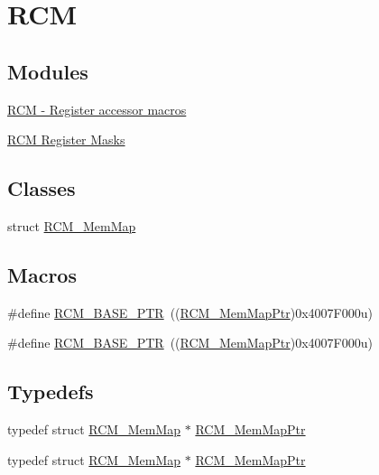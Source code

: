 \hypertarget{group___r_c_m___peripheral}{}\section{R\+CM}
\label{group___r_c_m___peripheral}
\subsection*{Modules}
\begin{DoxyCompactItemize}
\item 
\hyperlink{group___r_c_m___register___accessor___macros}{R\+C\+M -\/ Register accessor macros}
\item 
\hyperlink{group___r_c_m___register___masks}{R\+C\+M Register Masks}
\end{DoxyCompactItemize}
\subsection*{Classes}
\begin{DoxyCompactItemize}
\item 
struct \hyperlink{struct_r_c_m___mem_map}{R\+C\+M\+\_\+\+Mem\+Map}
\end{DoxyCompactItemize}
\subsection*{Macros}
\begin{DoxyCompactItemize}
\item 
\#define \hyperlink{group___r_c_m___peripheral_ga25ab3aa8d593d455ed36a52c77f88234}{R\+C\+M\+\_\+\+B\+A\+S\+E\+\_\+\+P\+TR}~((\hyperlink{group___r_c_m___peripheral_ga787b1c58d947f0b81c2502227dd0396b}{R\+C\+M\+\_\+\+Mem\+Map\+Ptr})0x4007\+F000u)
\item 
\#define \hyperlink{group___r_c_m___peripheral_ga25ab3aa8d593d455ed36a52c77f88234}{R\+C\+M\+\_\+\+B\+A\+S\+E\+\_\+\+P\+TR}~((\hyperlink{group___r_c_m___peripheral_ga787b1c58d947f0b81c2502227dd0396b}{R\+C\+M\+\_\+\+Mem\+Map\+Ptr})0x4007\+F000u)
\end{DoxyCompactItemize}
\subsection*{Typedefs}
\begin{DoxyCompactItemize}
\item 
typedef struct \hyperlink{struct_r_c_m___mem_map}{R\+C\+M\+\_\+\+Mem\+Map} $\ast$ \hyperlink{group___r_c_m___peripheral_ga787b1c58d947f0b81c2502227dd0396b}{R\+C\+M\+\_\+\+Mem\+Map\+Ptr}
\item 
typedef struct \hyperlink{struct_r_c_m___mem_map}{R\+C\+M\+\_\+\+Mem\+Map} $\ast$ \hyperlink{group___r_c_m___peripheral_ga787b1c58d947f0b81c2502227dd0396b}{R\+C\+M\+\_\+\+Mem\+Map\+Ptr}
\end{DoxyCompactItemize}


